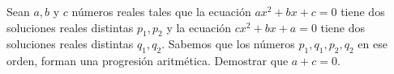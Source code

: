 Sean $ a,b$ y $ c$ números reales tales que la ecuación $ax^2 + bx  + c = 0$ tiene dos soluciones reales distintas $ p_1,p_2$ y la ecuación $ cx^2 + bx + a = 0$ tiene dos soluciones reales distintas $ q_1,q_2$. Sabemos que los números $ p_1,q_1,p_2,q_2$ en ese orden, forman una progresión aritmética. Demostrar que $ a+c=0$.
